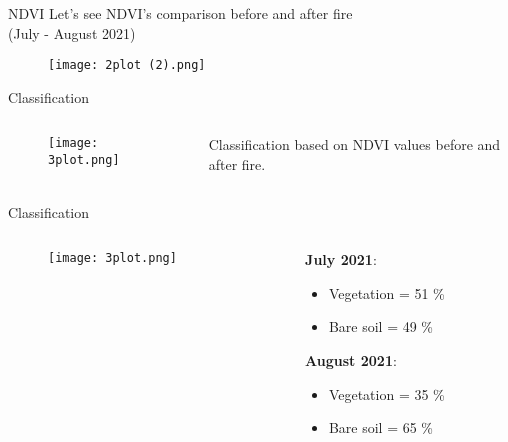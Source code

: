 \documentclass{beamer}
\begin{document}
\begin{frame}{NDVI}
\centering
Let's see NDVI's comparison before and after fire\\
(July - August 2021)
\begin{figure}
    \centering
    \texttt{[image: 2plot (2).png]}
\end{figure}   
\end{frame}

\begin{frame}{Classification}
\begin{columns}
    \begin{column}{0.65\textwidth}
    \begin{figure}
           \centering
           \texttt{[image: 3plot.png]}
       \end{figure}   
    \end{column}

    \begin{column}{0.5\textwidth}
       Classification based on NDVI values before and after fire. 
    \end{column}
\end{columns}    
\end{frame}

\begin{frame}{Classification}
\begin{columns}
    \begin{column}{0.65\textwidth}
    \begin{figure}
           \centering
           \texttt{[image: 3plot.png]}
       \end{figure}   
    \end{column}

    \begin{column}{0.5\textwidth}
    \textbf{July 2021}:
        \begin{itemize}
            \item Vegetation = 51 \%
            \item Bare soil = 49 \%
        \end{itemize}
        \bigskip
        \bigskip
        \bigskip
        \textbf{August 2021}:
        \begin{itemize}
            \item Vegetation = 35 \%
            \item Bare soil = 65 \%
        \end{itemize}
    \end{column}
\end{columns}    
\end{frame}
\end{document}
